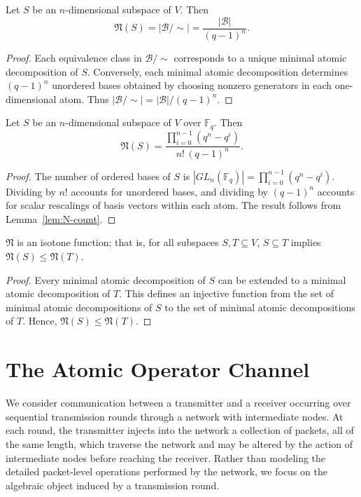 \documentclass{svproc}
\begin{document}
\begin{lemma}\label{lem:N-count}
Let $S$ be an $n$-dimensional subspace of $V$.
Then
\[
\mathfrak N(S) = |\mathcal B/\!\sim| = \frac{|\mathcal B|}{(q-1)^n}.
\]
\end{lemma}

\begin{proof}
Each equivalence class in $\mathcal B/\!\sim$ corresponds to a unique minimal
atomic decomposition of $S$.
Conversely, each minimal atomic decomposition determines $(q-1)^n$ unordered
bases obtained by choosing nonzero generators in each one-dimensional atom.
Thus $|\mathcal B/\!\sim| = |\mathcal B|/(q-1)^n$.
\end{proof}

\begin{theorem}
Let $S$ be an $n$-dimensional subspace of $V$ over $\mathbb F_q$.
Then
\[
\mathfrak N(S)
= \frac{\prod_{i=0}^{n-1}(q^n - q^i)}{n!\,(q-1)^n}.
\]
\end{theorem}

\begin{proof}
The number of ordered bases of $S$ is $|GL_n(\mathbb F_q)|=\prod_{i=0}^{n-1}(q^n-q^i)$.
Dividing by $n!$ accounts for unordered bases, and dividing by $(q-1)^n$ accounts
for scalar rescalings of basis vectors within each atom.
The result follows from Lemma~\ref{lem:N-count}.
\end{proof}
\begin{corollary}\label{Isotonic} $\mathfrak{N}$ is an isotone function; that is, for all subspaces $S,T\subseteq V$, $S\subseteq T$ implies $\mathfrak{N}(S)\le \mathfrak{N}(T)$.
\end{corollary}

\begin{proof}
    Every minimal atomic decomposition of $S$ can be extended to a minimal atomic decomposition of $T$. This defines an injective function from the set of minimal atomic decompositions of $S$ to the set of minimal atomic decompositions of $T$. Hence, $\mathfrak{N}(S)\le \mathfrak{N}(T)$. 
\end{proof}

\section{The Atomic Operator Channel}\label{sec:atomic_channel}
We consider communication between a transmitter and a receiver occurring over
sequential transmission rounds through a network with intermediate nodes.
At each round, the transmitter injects into the network a collection of packets,
all of the same length, which traverse the network and may be altered by the action
of intermediate nodes before reaching the receiver.
Rather than modeling the detailed packet-level operations performed by the network,
we focus on the algebraic object induced by a transmission round.
\end{document}
